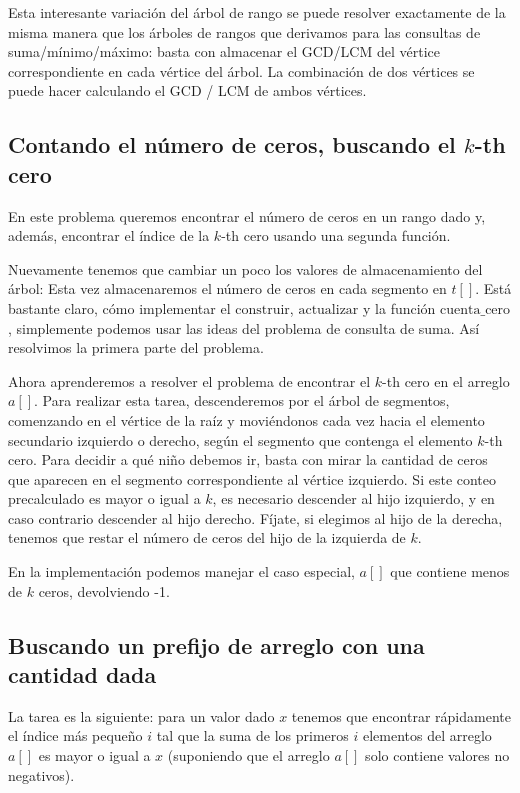 Esta interesante variación del árbol de rango se puede resolver exactamente de la misma manera que los árboles de rangos que derivamos para las consultas de suma/mínimo/máximo: basta con almacenar el GCD/LCM del vértice correspondiente en cada vértice del árbol. La combinación de dos vértices se puede hacer calculando el GCD / LCM de ambos vértices.

\subsection{Contando el número de ceros, buscando el $k$-th cero}

En este problema queremos encontrar el número de ceros en un rango dado y, además, encontrar el índice de la $k$-th cero usando una segunda función.

Nuevamente tenemos que cambiar un poco los valores de almacenamiento del árbol: Esta vez almacenaremos 
el número de ceros en cada segmento en $t[]$. Está bastante claro, cómo implementar el 
$\text{construir}$, $\text{actualizar}$ y la función $\text{cuenta\_cero}$, simplemente podemos usar las ideas del problema de consulta de suma. Así resolvimos la primera parte del problema.

Ahora aprenderemos a resolver el problema de encontrar el $k$-th cero en el arreglo $a[]$. Para realizar esta tarea, descenderemos por el árbol de segmentos, comenzando en el vértice de la raíz y moviéndonos cada vez hacia el elemento secundario izquierdo o derecho, según el segmento que contenga el elemento $k$-th cero. Para decidir a qué niño debemos ir, basta con mirar la cantidad de ceros que aparecen en el segmento correspondiente al vértice izquierdo. Si este conteo precalculado es mayor o igual a $k$, es necesario descender al hijo izquierdo, y en caso contrario descender al hijo derecho. Fíjate, si elegimos al hijo de la derecha, tenemos que restar el número de ceros del hijo de la izquierda de $k$.

En la implementación podemos manejar el caso especial, $a[]$ que contiene menos de $k$ ceros, devolviendo -1.

\subsection{Buscando un prefijo de arreglo con una cantidad dada}

La tarea es la siguiente: para un valor dado $x$ tenemos que encontrar rápidamente el índice más 
pequeño $i$ tal que la suma de los primeros $i$ elementos del arreglo $a[]$ es mayor o igual a $x$ (suponiendo que el arreglo $a[]$ solo contiene valores no negativos).

